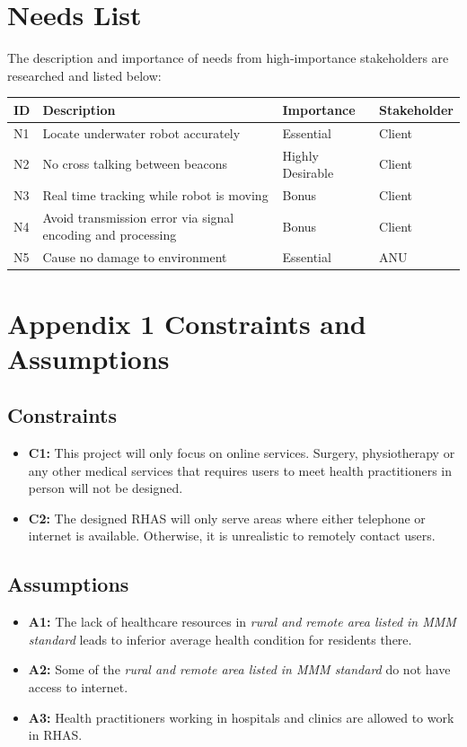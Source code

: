 \documentclass{article}
\begin{document}
\section{Needs List}
The description and importance of needs from high-importance stakeholders are researched and listed below:
\begin{center}
\begin{tabular}{ | m{2em} | m{18em}| m{8em} | m{5em} |} 
  \hline
  ID & Description & Importance & Stakeholder\\ 
  \hline
  N1 & Locate underwater robot accurately & Essential & Client \\
  \hline
  N2 & No cross talking between beacons & Highly Desirable & Client \\
  \hline
  N3 & Real time tracking while robot is moving & Bonus & Client\\
  \hline
  N4 & Avoid transmission error via signal encoding and processing & Bonus & Client \\
  \hline
  N5 & Cause no damage to environment & Essential & ANU \\
  \hline
\end{tabular}
\end{center}

\setcounter{secnumdepth}{0}
\section{Appendix 1 Constraints and Assumptions}
\subsection{Constraints}
\begin{itemize}[label={}]
\item \textbf{C1:} This project will only focus on online services. Surgery, physiotherapy or any other medical services that requires users to meet health practitioners in person will not be designed.
\item \textbf{C2:} The designed RHAS will only serve areas where either telephone or internet is available. Otherwise, it is unrealistic to remotely contact users.
\end{itemize}
\subsection{Assumptions}
\begin{itemize}[label={}]
\item \textbf{A1:} The lack of healthcare resources in \textit{rural and remote area listed in MMM standard} leads to inferior average health condition for residents there.
\item \textbf{A2:} Some of the \textit{rural and remote area listed in MMM standard} do not have access to internet.
\item \textbf{A3:} Health practitioners working in hospitals and clinics are allowed to work in RHAS.
\end{itemize}
\end{document}
